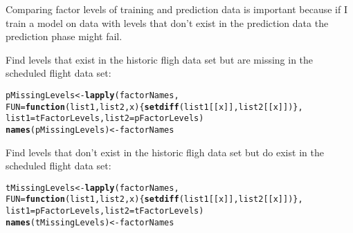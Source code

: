\documentclass{article}\usepackage[]{graphicx}\usepackage[]{color}
\makeatletter
\newcommand{\hlstd}[1]{\textcolor[rgb]{0.345,0.345,0.345}{#1}}%
\newcommand{\hlkwa}[1]{\textcolor[rgb]{0.161,0.373,0.58}{\textbf{#1}}}%
\newcommand{\hlkwb}[1]{\textcolor[rgb]{0.69,0.353,0.396}{#1}}%
\newcommand{\hlkwc}[1]{\textcolor[rgb]{0.333,0.667,0.333}{#1}}%
\newcommand{\hlkwd}[1]{\textcolor[rgb]{0.737,0.353,0.396}{\textbf{#1}}}%
\newenvironment{kframe}{%
 \def\at@end@of@kframe{}%
 \ifinner\ifhmode%
  \def\at@end@of@kframe{\end{minipage}}%
  \begin{minipage}{\columnwidth}%
 \fi\fi%
 \def\FrameCommand##1{\hskip\@totalleftmargin \hskip-\fboxsep
 \colorbox{shadecolor}{##1}\hskip-\fboxsep
     \hskip-\linewidth \hskip-\@totalleftmargin \hskip\columnwidth}%
 \MakeFramed {\advance\hsize-\width
   \@totalleftmargin\z@ \linewidth\hsize
   \@setminipage}}%
 {\par\unskip\endMakeFramed%
 \at@end@of@kframe}
\newenvironment{knitrout}{}{} %
\makeatother
\begin{document}
Comparing factor levels of training and prediction data is important because if I train a model on data with levels that don't exist in the prediction data the prediction phase might fail.





Find levels that exist in the historic fligh data set but are missing in the scheduled flight data set:
\begin{knitrout}
\color{fgcolor}\begin{kframe}
\begin{alltt}
\hlstd{pMissingLevels} \hlkwb{<-} \hlkwd{lapply}\hlstd{(factorNames,}
                        \hlkwc{FUN}\hlstd{=}\hlkwa{function}\hlstd{(}\hlkwc{list1}\hlstd{,} \hlkwc{list2}\hlstd{,} \hlkwc{x}\hlstd{) \{} \hlkwd{setdiff}\hlstd{(list1[[x]], list2[[x]]) \},}
                        \hlkwc{list1}\hlstd{=tFactorLevels,} \hlkwc{list2}\hlstd{=pFactorLevels)}
\hlkwd{names}\hlstd{(pMissingLevels)} \hlkwb{<-} \hlstd{factorNames}
\end{alltt}
\end{kframe}
\end{knitrout}

Find levels that don't exist in the historic fligh data set but do exist in the scheduled flight data set:
\begin{knitrout}
\color{fgcolor}\begin{kframe}
\begin{alltt}
\hlstd{tMissingLevels} \hlkwb{<-} \hlkwd{lapply}\hlstd{(factorNames,}
                        \hlkwc{FUN}\hlstd{=}\hlkwa{function}\hlstd{(}\hlkwc{list1}\hlstd{,} \hlkwc{list2}\hlstd{,} \hlkwc{x}\hlstd{) \{} \hlkwd{setdiff}\hlstd{(list1[[x]], list2[[x]]) \},}
                        \hlkwc{list1}\hlstd{=pFactorLevels,} \hlkwc{list2}\hlstd{=tFactorLevels)}
\hlkwd{names}\hlstd{(tMissingLevels)} \hlkwb{<-} \hlstd{factorNames}
\end{alltt}
\end{kframe}
\end{knitrout}
\end{document}
